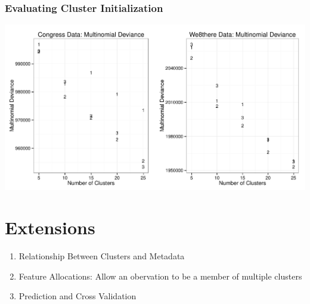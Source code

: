 \documentclass{beamer}
\begin{document}
\begin{frame}
\frametitle{Evaluating Cluster Initialization}
\begin{center}
\includegraphics[width=1.05\textwidth]{Images/mdev_both.pdf}
\end{center}
\end{frame}

\section{Extensions}
\begin{frame}
\begin{enumerate}
\item<+-> Relationship Between Clusters and Metadata
\item<+-> Feature Allocations: Allow an obervation to be a member of multiple clusters
\item<+-> Prediction and Cross Validation
\end{enumerate}
\end{frame}
\end{document}
